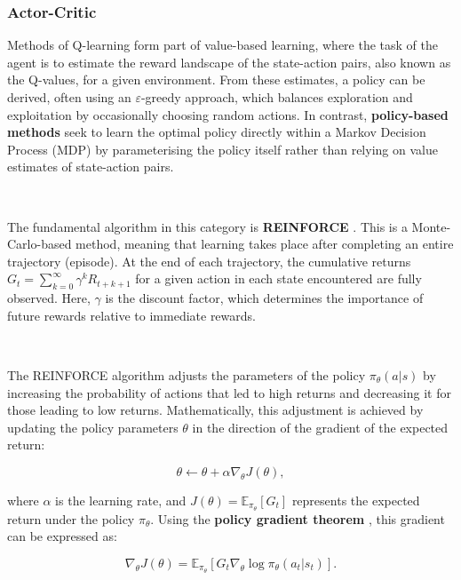 \documentclass{article}
\begin{document}
\subsubsection{Actor-Critic} 

Methods of Q-learning form part of value-based learning, where the task of the agent is to estimate the reward landscape of the state-action pairs, also known as the Q-values, for a given environment. From these estimates, a policy can be derived, often using an $\varepsilon$-greedy approach, which balances exploration and exploitation by occasionally choosing random actions. In contrast, \textbf{policy-based methods} seek to learn the optimal policy directly within a Markov Decision Process (MDP) by parameterising the policy itself rather than relying on value estimates of state-action pairs.

\

The fundamental algorithm in this category is \textbf{REINFORCE} \citep{williams1992simple}. This is a Monte-Carlo-based method, meaning that learning takes place after completing an entire trajectory (episode). At the end of each trajectory, the cumulative returns $G_t = \sum_{k=0}^{\infty} \gamma^k R_{t+k+1}$ for a given action in each state encountered are fully observed. Here, $\gamma$ is the discount factor, which determines the importance of future rewards relative to immediate rewards.

\

The REINFORCE algorithm adjusts the parameters of the policy $\pi_\theta(a|s)$ by increasing the probability of actions that led to high returns and decreasing it for those leading to low returns. Mathematically, this adjustment is achieved by updating the policy parameters $\theta$ in the direction of the gradient of the expected return:

\begin{equation}
\theta \leftarrow \theta + \alpha \nabla_\theta J(\theta),
\end{equation}

where $\alpha$ is the learning rate, and $J(\theta) = \mathbb{E}_{\pi_\theta} [G_t]$ represents the expected return under the policy $\pi_\theta$. Using the \textbf{policy gradient theorem} \citep{sutton1999policy}, this gradient can be expressed as:

\begin{equation}
\nabla_\theta J(\theta) = \mathbb{E}_{\pi_\theta} \left[ G_t \nabla_\theta \log \pi_\theta(a_t | s_t) \right].
\end{equation}
\end{document}
